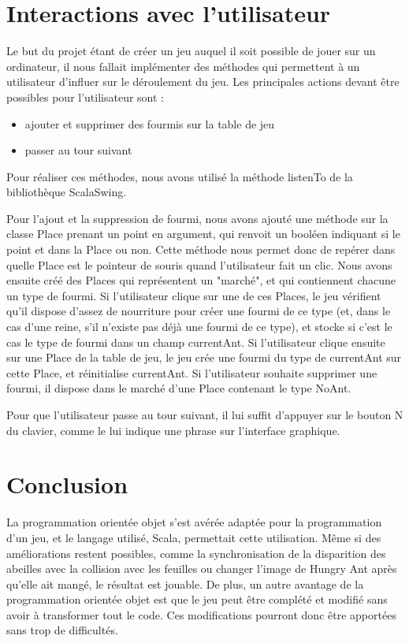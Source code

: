 \documentclass[10pt,a4paper]{article}
\begin{document}
\section{Interactions avec l'utilisateur}
Le but du projet étant de créer un jeu auquel il soit possible de jouer sur un ordinateur, il nous fallait implémenter des méthodes qui permettent à un utilisateur d'influer sur le déroulement du jeu. Les principales actions devant être possibles pour l'utilisateur sont :
\begin{itemize}
  \item ajouter et supprimer des fourmis sur la table de jeu
  \item passer au tour suivant
\end{itemize}

Pour réaliser ces méthodes, nous avons utilisé la méthode listenTo de la bibliothèque ScalaSwing.

Pour l'ajout et la suppression de fourmi, nous avons ajouté une méthode sur la classe Place prenant un point en argument, qui renvoit un booléen indiquant si le point et dans la Place ou non. Cette méthode nous permet donc de repérer dans quelle Place est le pointeur de souris quand l'utilisateur fait un clic. Nous avons ensuite créé des Places qui représentent un "marché", et qui contiennent chacune un type de fourmi. Si l'utilisateur clique sur une de ces Places, le jeu vérifient qu'il dispose d'assez de nourriture pour créer une fourmi de ce type (et, dans le cas d'une reine, s'il n'existe pas déjà une fourmi de ce type), et stocke si c'est le cas le type de fourmi dans un champ currentAnt. Si l'utilisateur clique ensuite sur une Place de la table de jeu, le jeu crée une fourmi du type de currentAnt sur cette Place, et réinitialise currentAnt. Si l'utilisateur souhaite supprimer une fourmi, il dispose dans le marché d'une Place contenant le type NoAnt.

Pour que l'utilisateur passe au tour suivant, il lui suffit d'appuyer sur le bouton N du clavier, comme le lui indique une phrase sur l'interface graphique. 


\section*{Conclusion}

La programmation orientée objet s'est avérée adaptée pour la programmation d'un jeu, et le langage utilisé, Scala, permettait cette utilisation. Même si des améliorations restent possibles, comme la synchronisation de la disparition des abeilles avec la collision avec les feuilles ou changer l'image de Hungry Ant après qu'elle ait mangé, le résultat est jouable. De plus, un autre avantage de la programmation orientée objet est que le jeu peut être complété et modifié sans avoir à transformer tout le code. Ces modifications pourront donc être apportées sans trop de difficultés.
\end{document}
